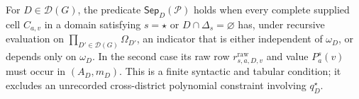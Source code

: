 For \(D\in\mathcal D(G)\), the predicate \(\mathsf{Sep}_D(\mathcal P)\) holds when every complete supplied cell \(C_{a,v}\) in a domain satisfying \(s=\star\) or \(D\cap\Delta_s=\varnothing\) has, under recursive evaluation on \(\prod_{D'\in\mathcal D(G)}\Omega_{D'}\), an indicator that is either independent of \(\omega_D\), or depends only on \(\omega_D\).  In the second case its raw row \(r^{\mathrm{raw}}_{s,a,D,v}\) and value \(P_a^s(v)\) must occur in \((A_D,m_D)\).  This is a finite syntactic and tabular condition; it excludes an unrecorded cross-district polynomial constraint involving \(q_D^\star\).